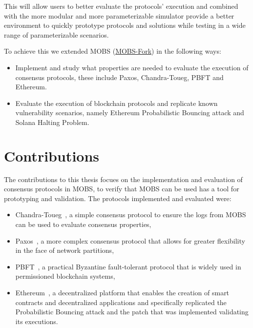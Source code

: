 This will allow users to better evaluate the protocols' execution and combined with the more modular and more
parameterizable simulator provide a better environment to quickly prototype protocols and solutions while testing in
a wide range of parameterizable scenarios.

To achieve this we extended MOBS (\href{https://github.com/RMLoureiro/MOBS}{MOBS-Fork}) in the following ways:
\begin{itemize}
  \item Implement and study what properties are needed to evaluate the execution of consensus protocols, these include Paxos, Chandra-Toueg, PBFT and Ethereum.
  \item Evaluate the execution of blockchain protocols and replicate known
    vulnerability scenarios, namely Ethereum Probabilistic Bouncing attack\cite{ethereum_analysis} and 
    Solana Halting Problem\cite{solana_halting_problem}.
\end{itemize}



\section{Contributions}\label{sub:contributions}
The contributions to this thesis focues on the implementation and evaluation of consensus protocols in MOBS, to verify that MOBS can be used
has a tool for prototyping and validation. The protocols implemented and evaluated were:
\begin{itemize}
  \item Chandra-Toueg~\cite{chandra}, a simple consensus protocol to ensure the logs from MOBS can be used to evaluate consensus properties,
  \item Paxos~\cite{paxos}, a more complex consensus protocol that allows for greater flexibility in the face of network partitions,
  \item PBFT~\cite{pbft}, a practical Byzantine fault-tolerant protocol that is widely used in permissioned blockchain systems,
  \item Ethereum~\cite{ethereum}, a decentralized platform that enables the creation of smart contracts and decentralized applications and specifically
replicated the Probabilistic Bouncing attack and the patch that was implemented validating its executions.
\end{itemize}